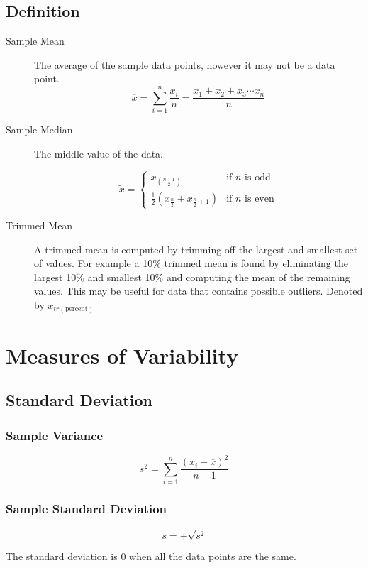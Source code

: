 \documentclass{article}
\begin{document}
\subsection{Definition}
\begin{description}
\item[Sample Mean] The average of the sample data points, however it may not be a data point.
$$\overline{x} = \sum_{i=1}^n\frac{x_i}{n} = \frac{x_1+x_2+x_3\cdots x_n}{n}$$
\item[Sample Median] The middle value of the data.

$$\tilde{x}=\left\{
\begin{matrix}
x_{(\frac{n+1}{2})} & \text{if $n$ is odd}\\
\frac{1}{2}(x_{\frac{n}{2}}+x_{\frac{n}{2}+1}) & \text{if $n$ is even}
\end{matrix}
\right.$$

\item[Trimmed Mean] A trimmed mean is computed by trimming off the largest and smallest set of values. For example a 10\% trimmed mean is found by eliminating the largest 10\% and smallest 10\% and computing the mean of the remaining values. This may be useful for data that contains possible outliers. Denoted by $x_{tr(\text{percent})}$
\end{description}

\section{Measures of Variability}

\subsection{Standard Deviation}

\subsubsection{Sample Variance}

$$s^2 = \sum_{i=1}^n \frac{(x_i - \overline{x})^2}{n-1}$$

\subsubsection{Sample Standard Deviation}

$$s=+\sqrt{s^2}$$

The standard deviation is $0$ when all the data points are the same.
\end{document}
